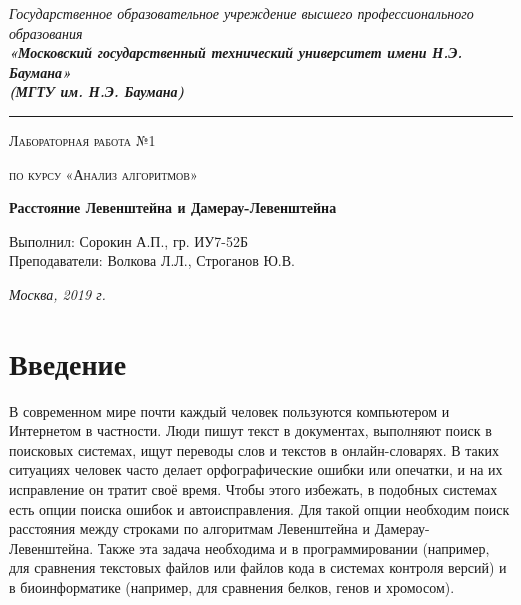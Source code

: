\documentclass[12pt, a4paper]{report}
\begin{document}
    \begin{titlepage}

        \begin{center}
            \Large
            {\sl Государственное образовательное учреждение высшего профессионального образования\\
            {\bf«Московский государственный технический университет имени Н.Э. Баумана»\\
				(МГТУ им. Н.Э. Баумана)}}
				\noindent\rule{\textwidth}{2pt}
            \vspace{3cm}

			{\scshape\LARGE Лабораторная работа №1 \par}
			\vspace{0.5cm}	
			{\scshape\LARGE по курсу «Анализ алгоритмов» \par}
			\vspace{1.5cm}
			{\huge\bfseries Расстояние Левенштейна и Дамерау-Левенштейна \par}
			\vspace{2cm}
			\Large Выполнил: Сорокин А.П., гр. ИУ7-52Б\\
			\vspace{0.5cm}
			{\Large Преподаватели: Волкова Л.Л., Строганов Ю.В.}
		
			\vfill
			\Large \textit {Москва, 2019 г.}
            
        \end{center}

    \end{titlepage}
	
	\tableofcontents

	\chapter*{Введение}
	
	В современном мире почти каждый человек пользуются компьютером и Интернетом в частности. Люди пишут текст в документах, выполняют поиск в поисковых системах, ищут переводы слов и текстов в онлайн-словарях. В таких ситуациях человек часто делает орфографические ошибки или опечатки, и на их исправление он тратит своё время. Чтобы этого избежать, в подобных системах есть опции поиска ошибок и автоисправления. Для такой опции необходим поиск расстояния между строками по алгоритмам Левенштейна и Дамерау-Левенштейна. Также эта задача необходима и в программировании (например, для сравнения текстовых файлов или файлов кода в системах контроля версий) и в биоинформатике (например, для сравнения белков, генов и хромосом).
\end{document}
